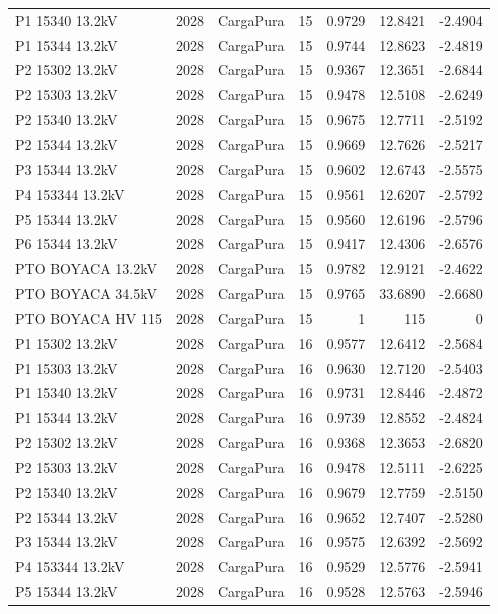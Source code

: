 \documentclass[11pt,a4paper]{article}
\begin{document}
\begin{longtable}{llllrrr}
P1 15340 13.2kV & 2028 & CargaPura & 15 & 0.9729 & 12.8421 & -2.4904 \\
P1 15344 13.2kV & 2028 & CargaPura & 15 & 0.9744 & 12.8623 & -2.4819 \\
P2 15302 13.2kV & 2028 & CargaPura & 15 & 0.9367 & 12.3651 & -2.6844 \\
P2 15303 13.2kV & 2028 & CargaPura & 15 & 0.9478 & 12.5108 & -2.6249 \\
P2 15340 13.2kV & 2028 & CargaPura & 15 & 0.9675 & 12.7711 & -2.5192 \\
P2 15344 13.2kV & 2028 & CargaPura & 15 & 0.9669 & 12.7626 & -2.5217 \\
P3 15344 13.2kV & 2028 & CargaPura & 15 & 0.9602 & 12.6743 & -2.5575 \\
P4 153344 13.2kV & 2028 & CargaPura & 15 & 0.9561 & 12.6207 & -2.5792 \\
P5 15344 13.2kV & 2028 & CargaPura & 15 & 0.9560 & 12.6196 & -2.5796 \\
P6 15344 13.2kV & 2028 & CargaPura & 15 & 0.9417 & 12.4306 & -2.6576 \\
PTO BOYACA 13.2kV & 2028 & CargaPura & 15 & 0.9782 & 12.9121 & -2.4622 \\
PTO BOYACA 34.5kV & 2028 & CargaPura & 15 & 0.9765 & 33.6890 & -2.6680 \\
PTO BOYACA HV 115 & 2028 & CargaPura & 15 & 1 & 115 & 0 \\
P1 15302 13.2kV & 2028 & CargaPura & 16 & 0.9577 & 12.6412 & -2.5684 \\
P1 15303 13.2kV & 2028 & CargaPura & 16 & 0.9630 & 12.7120 & -2.5403 \\
P1 15340 13.2kV & 2028 & CargaPura & 16 & 0.9731 & 12.8446 & -2.4872 \\
P1 15344 13.2kV & 2028 & CargaPura & 16 & 0.9739 & 12.8552 & -2.4824 \\
P2 15302 13.2kV & 2028 & CargaPura & 16 & 0.9368 & 12.3653 & -2.6820 \\
P2 15303 13.2kV & 2028 & CargaPura & 16 & 0.9478 & 12.5111 & -2.6225 \\
P2 15340 13.2kV & 2028 & CargaPura & 16 & 0.9679 & 12.7759 & -2.5150 \\
P2 15344 13.2kV & 2028 & CargaPura & 16 & 0.9652 & 12.7407 & -2.5280 \\
P3 15344 13.2kV & 2028 & CargaPura & 16 & 0.9575 & 12.6392 & -2.5692 \\
P4 153344 13.2kV & 2028 & CargaPura & 16 & 0.9529 & 12.5776 & -2.5941 \\
P5 15344 13.2kV & 2028 & CargaPura & 16 & 0.9528 & 12.5763 & -2.5946 \\

\end{longtable}
\end{document}

